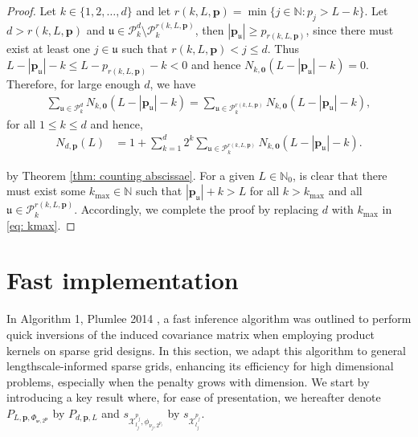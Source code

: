 \documentclass[pdflatex,sn-mathphys-num]{sn-jnl}%
\theoremstyle{thmstyleone}%
\theoremstyle{thmstyletwo}%
\theoremstyle{thmstylethree}%
\begin{document}
\begin{proof}
Let \(k\in\{1,2,\dots,d\}\) and let \(r(k,L,\mathbf{p})=\min\{j\in\mathbb{N}:p_j>L-k\}\). Let \(d>r(k,L,\mathbf{p})\) and \(\mathfrak{u}\in\mathcal{P}_k^d\setminus\mathcal{P}_k^{r(k,L,\mathbf{p})}\), then \(|\mathbf{p_{\mathfrak{u}}}|\geq p_{r(k,L,\mathbf{p})}\), since there must exist at least one \(j\in\mathfrak{u}\) such that \(r(k,L,\mathbf{p})<j\leq d\). Thus \(L-|\mathbf{p}_{\mathfrak{u}}|-k\leq L-p_{{r(k,L,\mathbf{p})}}-k<0\) and hence \(N_{k,\mathbf{0}}(L-|\mathbf{p}_{\mathfrak{u}}|-k)=0\). Therefore, for large enough \(d\), we have
\begin{align}
    \sum_{\mathfrak{u}\in\mathcal{P}^d_k}N_{k,\mathbf{0}}(L-|\mathbf{p}_{\mathfrak{u}}|-k)=\sum_{\mathfrak{u}\in\mathcal{P}^{r(k,L,\mathbf{p})}_k}N_{k,\mathbf{0}}(L-|\mathbf{p}_{\mathfrak{u}}|-k),\nonumber
\end{align}
for all \(1\leq k\leq d\) and hence,
\begin{align}
    N_{d,\mathbf{p}}(L)&=1+\sum_{k=1}^d2^k\sum_{\mathfrak{u}\in\mathcal{P}^{r(k,L,\mathbf{p})}_k}N_{k,\mathbf{0}}(L-|\mathbf{p}_{\mathfrak{u}}|-k).\label{eq: kmax}
\end{align}

by Theorem \ref{thm: counting abscissae}. For a given \(L\in\mathbb{N}_0\), is clear that there must exist some \(k_{\max}\in\mathbb{N}\) such that \(|\mathbf{p}_{\mathfrak{u}}|+k>L\) for all \(k>k_{\max}\) and all \(\mathfrak{u}\in\mathcal{P}^{r(k,L,\mathbf{p})}_k\). Accordingly, we complete the proof by replacing \(d\) with \(k_{\max}\) in \eqref{eq: kmax}.

\end{proof}

\section{Fast implementation}\label{sec:fast implementation}
In Algorithm 1, Plumlee 2014 \cite{Plumlee2014}, a fast inference algorithm was outlined to perform quick inversions of the induced covariance matrix when employing product kernels on sparse grid designs. In this section, we adapt this algorithm to general lengthscale-informed sparse grids, enhancing its efficiency for high dimensional problems, especially when the penalty grows with dimension. We start by introducing a key result where, for ease of presentation, we hereafter denote \(P_{L,\mathbf{p},\Phi_{\boldsymbol{\nu},2^{\mathbf{p}}}}\) by \(P_{d,\mathbf{p},L}\) and \(s_{\mathcal{X}_{l_j}^{p_j}, \phi_{\nu_j,2^{p_j}}}\) by \(s_{\mathcal{X}_{l_j}^{p_j}}\).
\end{document}

